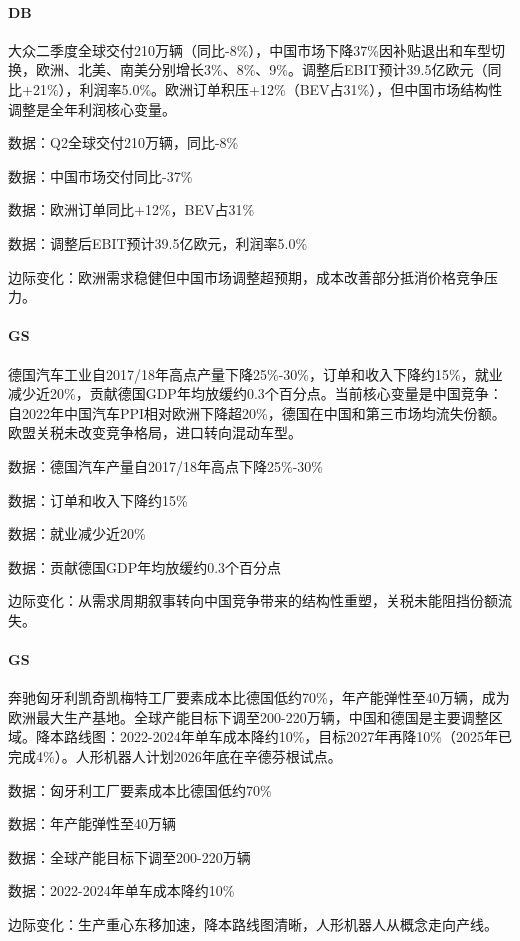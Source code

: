\documentclass[11pt]{ctexart}
\begin{document}
\paragraph{DB} 大众二季度全球交付210万辆（同比-8\%），中国市场下降37\%因补贴退出和车型切换，欧洲、北美、南美分别增长3\%、8\%、9\%。调整后EBIT预计39.5亿欧元（同比+21\%），利润率5.0\%。欧洲订单积压+12\%（BEV占31\%），但中国市场结构性调整是全年利润核心变量。
{\small\color{refgray}数据：Q2全球交付210万辆，同比-8\%\par}
{\small\color{refgray}数据：中国市场交付同比-37\%\par}
{\small\color{refgray}数据：欧洲订单同比+12\%，BEV占31\%\par}
{\small\color{refgray}数据：调整后EBIT预计39.5亿欧元，利润率5.0\%\par}
{\small\color{refgray}边际变化：欧洲需求稳健但中国市场调整超预期，成本改善部分抵消价格竞争压力。\par}
\paragraph{GS} 德国汽车工业自2017/18年高点产量下降25\%-30\%，订单和收入下降约15\%，就业减少近20\%，贡献德国GDP年均放缓约0.3个百分点。当前核心变量是中国竞争：自2022年中国汽车PPI相对欧洲下降超20\%，德国在中国和第三市场均流失份额。欧盟关税未改变竞争格局，进口转向混动车型。
{\small\color{refgray}数据：德国汽车产量自2017/18年高点下降25\%-30\%\par}
{\small\color{refgray}数据：订单和收入下降约15\%\par}
{\small\color{refgray}数据：就业减少近20\%\par}
{\small\color{refgray}数据：贡献德国GDP年均放缓约0.3个百分点\par}
{\small\color{refgray}边际变化：从需求周期叙事转向中国竞争带来的结构性重塑，关税未能阻挡份额流失。\par}
\paragraph{GS} 奔驰匈牙利凯奇凯梅特工厂要素成本比德国低约70\%，年产能弹性至40万辆，成为欧洲最大生产基地。全球产能目标下调至200-220万辆，中国和德国是主要调整区域。降本路线图：2022-2024年单车成本降约10\%，目标2027年再降10\%（2025年已完成4\%）。人形机器人计划2026年底在辛德芬根试点。
{\small\color{refgray}数据：匈牙利工厂要素成本比德国低约70\%\par}
{\small\color{refgray}数据：年产能弹性至40万辆\par}
{\small\color{refgray}数据：全球产能目标下调至200-220万辆\par}
{\small\color{refgray}数据：2022-2024年单车成本降约10\%\par}
{\small\color{refgray}边际变化：生产重心东移加速，降本路线图清晰，人形机器人从概念走向产线。\par}
\end{document}
